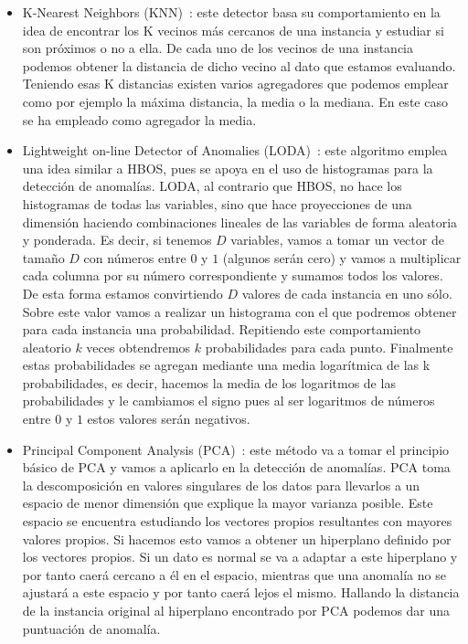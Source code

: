 \begin{itemize}
	\item K-Nearest Neighbors (KNN)~\cite{samaswamy_efficient_2000}: este detector basa su comportamiento en la idea de encontrar los K vecinos más cercanos de una instancia y estudiar si son próximos o no a ella. De cada uno de los vecinos de una instancia podemos obtener la distancia de dicho vecino al dato que estamos evaluando. Teniendo esas K distancias existen varios agregadores que podemos emplear como por ejemplo la máxima distancia, la media o la mediana. En este caso se ha empleado como agregador la media.
	\item Lightweight on-line Detector of Anomalies (LODA)~\cite{tomas_loda_2016}: este algoritmo emplea una idea similar a HBOS, pues se apoya en el uso de histogramas para la detección de anomalías. LODA, al contrario que HBOS, no hace los histogramas de todas las variables, sino que hace proyecciones de una dimensión haciendo combinaciones lineales de las variables de forma aleatoria y ponderada. Es decir, si tenemos $D$ variables, vamos a tomar un vector de tamaño $D$ con números entre $0$ y $1$ (algunos serán cero) y vamos a multiplicar cada columna por su número correspondiente y sumamos todos los valores. De esta forma estamos convirtiendo $D$ valores de cada instancia en uno sólo. Sobre este valor vamos a realizar un histograma con el que podremos obtener para cada instancia una probabilidad. Repitiendo este comportamiento aleatorio $k$ veces obtendremos $k$ probabilidades para cada punto. Finalmente estas probabilidades se agregan mediante una media logarítmica de las k probabilidades, es decir, hacemos la media de los logaritmos de las probabilidades y le cambiamos el signo pues al ser logaritmos de números entre $0$ y $1$ estos valores serán negativos.
	\item Principal Component Analysis (PCA)~\cite{mei-ling_novel_2003}: este método va a tomar el principio básico de PCA y vamos a aplicarlo en la detección de anomalías. PCA toma la descomposición en valores singulares de los datos para llevarlos a un espacio de menor dimensión que explique la mayor varianza posible. Este espacio se encuentra estudiando los vectores propios resultantes con mayores valores propios. Si hacemos esto vamos a obtener un hiperplano definido por los vectores propios. Si un dato es normal se va a adaptar a este hiperplano y por tanto caerá cercano a él en el espacio, mientras que una anomalía no se ajustará a este espacio y por tanto caerá lejos el mismo. Hallando la distancia de la instancia original al hiperplano encontrado por PCA podemos dar una puntuación de anomalía.

\end{itemize}
